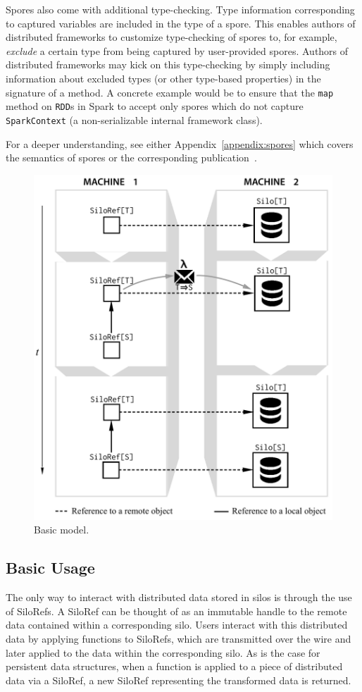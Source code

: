 \documentclass[preprint]{sigplanconf}
\theoremstyle{definition}
\theoremstyle{definition}
\begin{document}
Spores also come with additional type-checking. Type information corresponding
to captured variables are included in the type of a spore. This enables
authors of distributed frameworks to customize type-checking of spores to, for
example, {\em exclude} a certain type from being captured by user-provided
spores. Authors of distributed frameworks may kick on this type-checking by
simply including information about excluded types (or other type-based
properties) in the signature of a method. A concrete example would be to
ensure that the \verb|map| method on \verb|RDD|s in Spark to accept only
spores which do not capture \verb|SparkContext| (a non-serializable internal
framework class).

For a deeper understanding, see either Appendix~\ref{appendix:spores} which
covers the semantics of spores or the corresponding publication~\cite{Spores}.

\begin{figure}[t!]
\centering\includegraphics[width=0.8\columnwidth]{basic-diagram.pdf}
\caption{Basic model.}\label{fig:basic-diagram}
\end{figure}

\subsection{Basic Usage}

The only way to interact with distributed data stored in silos is through the
use of SiloRefs. A SiloRef can be thought of as an immutable handle to the
remote data contained within a corresponding silo. Users interact with this
distributed data by applying functions to SiloRefs, which are transmitted over
the wire and later applied to the data within the corresponding silo. As is
the case for persistent data structures, when a function is applied to a piece
of distributed data via a SiloRef, a new SiloRef representing the transformed
data is returned.
\end{document}
